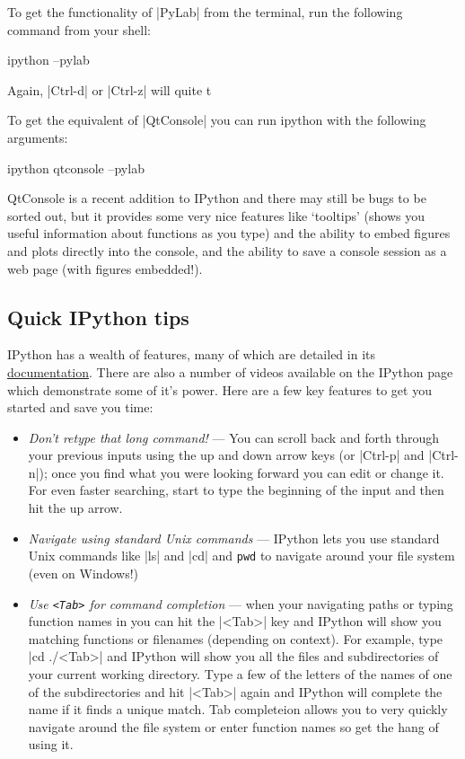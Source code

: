 To get the functionality of |PyLab| from the terminal, run the
following command from your shell:
%
\begin{bash}
ipython --pylab
\end{bash}
%
Again, |Ctrl-d| or |Ctrl-z| will quite t

To get the equivalent of |QtConsole| you can run ipython with
the following arguments:
%
\begin{bash}
ipython qtconsole --pylab
\end{bash}
%
QtConsole is a recent addition to IPython and there may still be bugs to
be sorted out, but it provides some very nice features like `tooltips'
(shows you useful information about functions as you type) and the
ability to embed figures and plots directly into the console, and the
ability to save a console session as a web page (with figures
embedded!).

\subsection{Quick IPython tips}

IPython has a wealth of features, many of which are detailed in its
\href{http://ipython.org/documentation.html}{documentation}. There are
also a number of videos available on the IPython page which demonstrate
some of it's power. Here are a few key features to get you started and
save you time:

\begin{itemize}
\item
  \emph{Don't retype that long command!} --- You can scroll back and
  forth through your previous inputs using the up and down arrow keys
  (or |Ctrl-p| and |Ctrl-n|); once you find what you
  were looking forward you can edit or change it. For even faster
  searching, start to type the beginning of the input and then hit the
  up arrow.
\item
  \emph{Navigate using standard Unix commands} --- IPython lets you use
  standard Unix commands like |ls| and |cd| and
  \lstinline!pwd! to navigate around your file system (even on Windows!)
\item
  \emph{Use \texttt{<Tab>} for command completion} ---
  when your navigating paths or typing function names in you can hit the
  |<Tab>| key and IPython will show you matching functions or
  filenames (depending on context). For example, type
  |cd ./<Tab>| and IPython will show you all the files and
  subdirectories of your current working directory. Type a few of the
  letters of the names of one of the subdirectories and hit
  |<Tab>| again and IPython will complete the name if it finds
  a unique match. Tab completeion allows you to very quickly navigate
  around the file system or enter function names so get the hang of
  using it.
\end{itemize}


